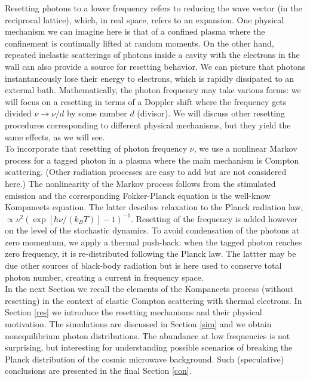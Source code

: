 \documentclass[a4paper,12pt,reqno,superscriptaddress,nofootinbib]{article}
\theoremstyle{plain}
\theoremstyle{definition}
\theoremstyle{remark}
\newcommand{\0}{^{(0)}}
\newcommand{\1}{^{(1)}}
\newcommand{\2}{^{(2)}}
\begin{document}
Resetting photons to a lower frequency refers to reducing the wave vector (in the reciprocal lattice), which, in real space, refers to an expansion. One physical mechanism we can imagine here is that of a confined plasma where the confinement is continually lifted at random moments. On the other hand, repeated inelastic scatterings of photons inside a cavity with the electrons in the wall can also provide a source for resetting behavior. We can picture that photons instantaneously lose their energy to electrons, which is rapidly dissipated to an external bath. 
Mathematically, the photon frequency may take various forms: we will focus on a resetting in terms of a Doppler shift where the frequency gets divided $\nu\rightarrow \nu/d$ by some number $d$ (divisor).  We will discuss other resetting procedures corresponding to different physical mechanisms, but they yield the same effects, as we will see.\\
To incorporate that resetting of photon frequency  $\nu$, we use a nonlinear Markov process for a tagged photon in a plasma where the main mechanism is Compton scattering.  (Other radiation processes are easy to add but are not considered here.)  The nonlinearity of the Markov process follows from the stimulated emission and the corresponding Fokker-Planck equation is the well-know Kompaneets equation.  The latter descibes relaxation to the Planck radiation law, $\propto \nu^2(\exp[\hbar\nu/(k_BT)]-1)^{-1}$.  Resetting of the frequency is added however on the level of the stochastic dynamics.  To avoid condensation of the photons at zero momentum, we apply a thermal push-back: when the tagged photon reaches zero frequency, it is re-distributed following the Planck law. The lattter may be due other sources of black-body radiation but is here used to conserve total photon number, creating a current in frequency space.\\

In the next Section we recall the elements of the Kompaneets process (without resetting) in the context of elastic Compton scattering with thermal electrons.  In Section \ref{res} we introduce the resetting mechanisms and their physical motivation.  The simulations are discussed in Section \ref{sim} and we obtain nonequilibrium photon distributions.  The abundance at low frequencies is not surprising, but interesting for understanding possible scenarios of breaking the Planck distribution of the cosmic microwave background.  Such (speculative) conclusions are presented in the final Section \ref{con}. 
\end{document}

